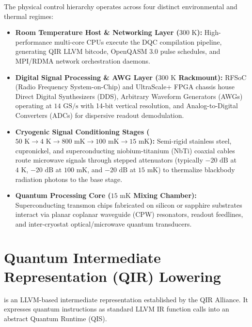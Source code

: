 The physical control hierarchy operates across four distinct environmental and thermal regimes:
\begin{itemize}
    \item \textbf{Room Temperature Host \& Networking Layer ($300\text{ K}$):} High-performance multi-core CPUs execute the DQC compilation pipeline, generating QIR LLVM bitcode, OpenQASM 3.0 pulse schedules, and MPI/RDMA network orchestration daemons.
    \item \textbf{Digital Signal Processing \& AWG Layer ($300\text{ K}$ Rackmount):} RFSoC (Radio Frequency System-on-Chip) and UltraScale+ FPGA chassis house Direct Digital Synthesizers (DDS), Arbitrary Waveform Generators (AWGs) operating at $14\text{ GS/s}$ with 14-bit vertical resolution, and Analog-to-Digital Converters (ADCs) for dispersive readout demodulation.
    \item \textbf{Cryogenic Signal Conditioning Stages ($50\text{ K} \to 4\text{ K} \to 800\text{ mK} \to 100\text{ mK} \to 15\text{ mK}$):} Semi-rigid stainless steel, cupronickel, and superconducting niobium-titanium (NbTi) coaxial cables route microwave signals through stepped attenuators (typically $-20\text{ dB}$ at $4\text{ K}$, $-20\text{ dB}$ at $100\text{ mK}$, and $-20\text{ dB}$ at $15\text{ mK}$) to thermalize blackbody radiation photons to the base stage.
    \item \textbf{Quantum Processing Core ($15\text{ mK}$ Mixing Chamber):} Superconducting transmon chips fabricated on silicon or sapphire substrates interact via planar coplanar waveguide (CPW) resonators, readout feedlines, and inter-cryostat optical/microwave quantum transducers.
\end{itemize}

\section{Quantum Intermediate Representation (QIR) Lowering}
\label{sec:qir_lowering}

 is an LLVM-based intermediate representation established by the QIR Alliance. It expresses quantum instructions as standard LLVM IR function calls into an abstract Quantum Runtime (QIS).

